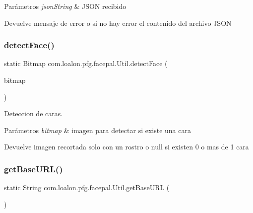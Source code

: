 \begin{DoxyParams}{Parámetros}
{\em json\+String} & J\+S\+ON recibido \\
\hline
\end{DoxyParams}
\begin{DoxyReturn}{Devuelve}
mensaje de error o si no hay error el contenido del archivo J\+S\+ON 
\end{DoxyReturn}
\mbox{\label{classcom_1_1loalon_1_1pfg_1_1facepal_1_1_util_a57c1890189bffa4c69c51e286a2f6dbf}} 
\subsubsection{\texorpdfstring{detect\+Face()}{detectFace()}}
{\footnotesize\ttfamily static Bitmap com.\+loalon.\+pfg.\+facepal.\+Util.\+detect\+Face (\begin{DoxyParamCaption}\item[{Bitmap}]{bitmap }\end{DoxyParamCaption})\hspace{0.3cm}{\ttfamily [static]}}



Deteccion de caras. 


\begin{DoxyParams}{Parámetros}
{\em bitmap} & imagen para detectar si existe una cara \\
\hline
\end{DoxyParams}
\begin{DoxyReturn}{Devuelve}
imagen recortada solo con un rostro o null si existen 0 o mas de 1 cara 
\end{DoxyReturn}
\mbox{\label{classcom_1_1loalon_1_1pfg_1_1facepal_1_1_util_aa2f3ea68628c684b86868bf5d3a1cd5f}} 
\subsubsection{\texorpdfstring{get\+Base\+U\+R\+L()}{getBaseURL()}}
{\footnotesize\ttfamily static String com.\+loalon.\+pfg.\+facepal.\+Util.\+get\+Base\+U\+RL (\begin{DoxyParamCaption}{ }\end{DoxyParamCaption})\hspace{0.3cm}{\ttfamily [static]}}



